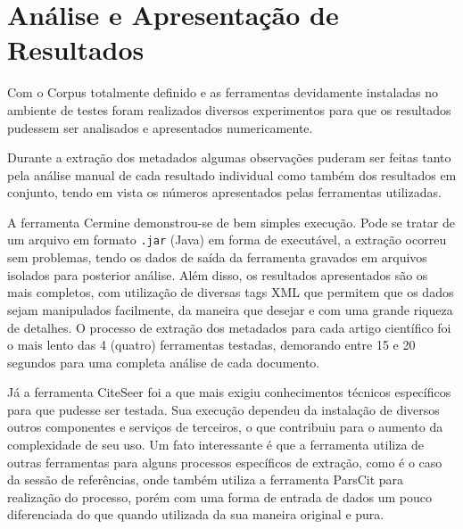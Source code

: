 
\chapter{Análise e Apresentação de Resultados}



Com o Corpus totalmente definido e as ferramentas devidamente instaladas no ambiente de testes foram realizados diversos experimentos para que os resultados pudessem ser analisados e apresentados numericamente.


Durante a extração dos metadados algumas observações puderam ser feitas tanto pela análise manual de cada resultado individual como também dos resultados em conjunto, tendo em vista os números apresentados pelas ferramentas utilizadas.

A ferramenta Cermine demonstrou-se de bem simples execução. Pode se tratar de um arquivo em formato \texttt{.jar} (Java) em forma de executável, a extração ocorreu sem problemas, tendo os dados de saída da ferramenta gravados em arquivos isolados para posterior análise. Além disso, os resultados apresentados são os mais completos, com utilização de diversas tags XML que permitem que os dados sejam manipulados facilmente, da maneira que desejar e com uma grande riqueza de detalhes. O processo de extração dos metadados para cada artigo científico foi o mais lento das 4 (quatro) ferramentas testadas, demorando entre 15 e 20 segundos para uma completa análise de cada documento.

Já a ferramenta CiteSeer foi a que mais exigiu conhecimentos técnicos específicos para que pudesse ser testada. Sua execução dependeu da instalação de diversos outros componentes e serviços de terceiros, o que contribuiu para o aumento da complexidade de seu uso. Um fato interessante é que a ferramenta utiliza de outras ferramentas para alguns processos específicos de extração, como é o caso da sessão de referências, onde também utiliza a ferramenta ParsCit para realização do processo, porém com uma forma de entrada de dados um pouco diferenciada do que quando utilizada da sua maneira original e pura.

